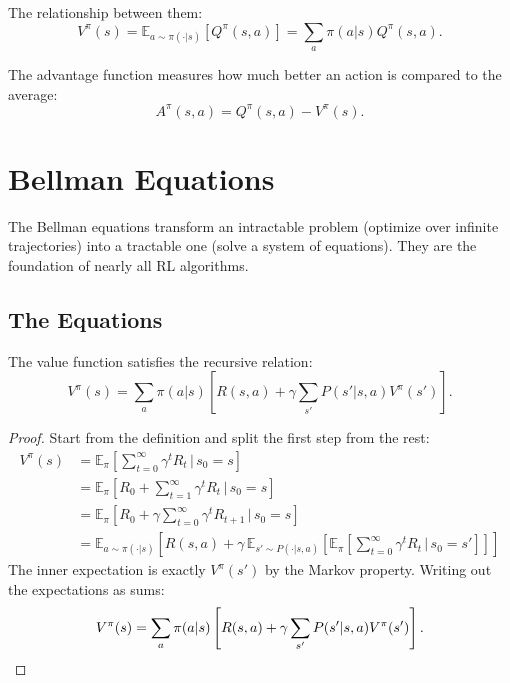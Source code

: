 The relationship between them:
\[
    V^\pi(s) = \mathbb{E}_{a \sim \pi(\cdot|s)}[Q^\pi(s,a)] = \sum_{a} \pi(a|s) Q^\pi(s,a).
\]

\begin{definition}
    The advantage function measures how much better an action is compared to the average:
    \[
        A^\pi(s, a) = Q^\pi(s, a) - V^\pi(s).
    \]
\end{definition}

\section{Bellman Equations}

The Bellman equations transform an intractable problem (optimize over infinite trajectories) into a tractable one (solve a system of equations). They are the foundation of nearly all RL algorithms.

\subsection{The Equations}

\begin{proposition}
    The value function satisfies the recursive relation:
    \[
        V^\pi(s) = \sum_{a} \pi(a|s) \left[ R(s,a) + \gamma \sum_{s'} P(s'|s,a) V^\pi(s') \right].
    \]
\end{proposition}

\begin{proof}
    Start from the definition and split the first step from the rest:
    \begin{align*}
        V^\pi(s) & = \mathbb{E}_\pi\left[ \sum_{t=0}^{\infty} \gamma^t R_t \,\Big|\, s_0 = s \right]                                                                                                                    \\
                 & = \mathbb{E}_\pi\left[ R_0 + \sum_{t=1}^{\infty} \gamma^t R_t \,\Big|\, s_0 = s \right]                                                                                                              \\
                 & = \mathbb{E}_\pi\left[ R_0 + \gamma \sum_{t=0}^{\infty} \gamma^t R_{t+1} \,\Big|\, s_0 = s \right]                                                                                                   \\
                 & = \mathbb{E}_{a \sim \pi(\cdot|s)}\left[ R(s,a) + \gamma \, \mathbb{E}_{s' \sim P(\cdot|s,a)}\left[ \mathbb{E}_\pi\left[ \sum_{t=0}^{\infty} \gamma^t R_t \,\Big|\, s_0 = s' \right] \right] \right]
    \end{align*}
    The inner expectation is exactly $V^\pi(s')$ by the Markov property. Writing out the expectations as sums:
    \[
        V^\pi(s) = \sum_{a} \pi(a|s) \left[ R(s,a) + \gamma \sum_{s'} P(s'|s,a) V^\pi(s') \right]. \qedhere
    \]
\end{proof}

